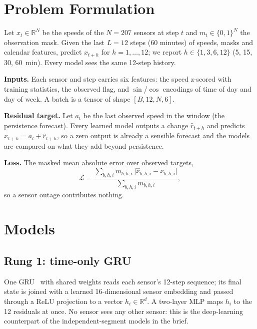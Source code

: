 \documentclass[conference]{IEEEtran}
\begin{document}
\section{Problem Formulation}
Let $x_t\in\mathbb{R}^{N}$ be the speeds of the $N=207$ sensors at step $t$ and $m_t\in\{0,1\}^N$ the observation mask. Given the last $L=12$ steps (60 minutes) of speeds, masks and calendar features, predict $x_{t+h}$ for $h=1,\dots,12$; we report $h\in\{1,3,6,12\}$ (5, 15, 30, 60~min). Every model sees the same 12-step history.

\textbf{Inputs.} Each sensor and step carries six features: the speed z-scored with training statistics, the observed flag, and $\sin$/$\cos$ encodings of time of day and day of week. A batch is a tensor of shape $[B,12,N,6]$.

\textbf{Residual target.} Let $a_t$ be the last observed speed in the window (the persistence forecast). Every learned model outputs a change $\hat r_{t+h}$ and predicts $\hat x_{t+h}=a_t+\hat r_{t+h}$, so a zero output is already a sensible forecast and the models are compared on what they add beyond persistence.

\textbf{Loss.} The masked mean absolute error over observed targets,
\begin{equation}
\mathcal{L}=\frac{\sum_{b,h,i} m_{b,h,i}\,\lvert \hat x_{b,h,i}-x_{b,h,i}\rvert}{\sum_{b,h,i} m_{b,h,i}},
\end{equation}
so a sensor outage contributes nothing.

\section{Models}
\subsection{Rung 1: time-only GRU}
One GRU~\cite{cho2014gru} with shared weights reads each sensor's 12-step sequence; its final state is joined with a learned 16-dimensional sensor embedding and passed through a ReLU projection to a vector $h_i\in\mathbb{R}^{d}$. A two-layer MLP maps $h_i$ to the 12 residuals at once. No sensor sees any other sensor: this is the deep-learning counterpart of the independent-segment models in the brief.
\end{document}
